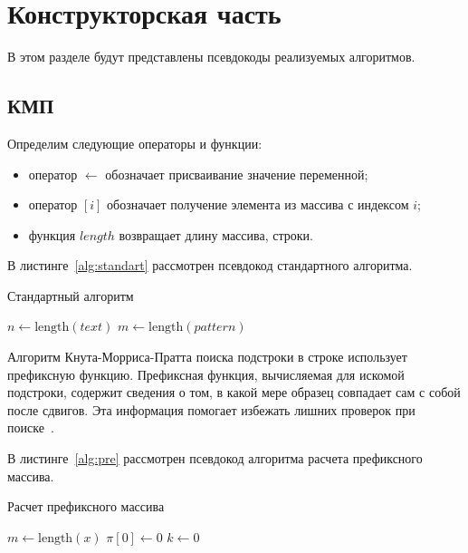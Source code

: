\section{Конструкторская часть}

В этом разделе будут представлены псевдокоды реализуемых алгоритмов.

\subsection{КМП}

Определим следующие операторы и функции:
\begin{itemize}
	\item оператор $\gets$ обозначает присваивание значение переменной;
	\item оператор $[i]$ обозначает получение элемента из массива с индексом $i$;
	\item функция $length$ возвращает длину массива, строки.
\end{itemize}

В листинге~\ref{alg:standart} рассмотрен псевдокод стандартного алгоритма.

\begin{algorithm}[H]
	\caption{Стандартный алгоритм}
	\label{alg:standart}
	\SetAlgoLined
	$n \gets \text{length}(text)$\;
	$m \gets \text{length}(pattern)$\;
	\;
\end{algorithm}

Алгоритм Кнута-Морриса-Пратта поиска подстроки в строке использует префиксную функцию. 
Префиксная функция, вычисляемая для искомой подстроки, содержит сведения о том, в какой мере образец совпадает сам с собой после сдвигов. 
Эта информация помогает избежать лишних проверок при поиске~\cite{алексеенко2010информационная}.

\newpage
В листинге~\ref{alg:pre} рассмотрен псевдокод алгоритма расчета префиксного массива.

\begin{algorithm}[H]
	\caption{Расчет префиксного массива}
	\label{alg:pre}
	\SetAlgoLined
	$m \gets \text{length}(x)$\;
	$\pi[0] \gets 0$\;
	$k \gets 0$\;
	\KwRet{$\pi$}\;
\end{algorithm}

